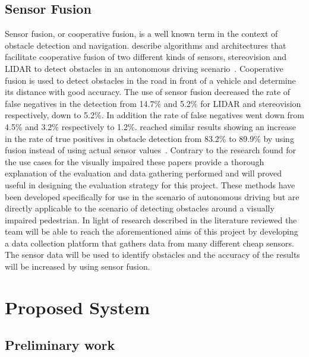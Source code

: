 \documentclass[prodmode,acmtosem]{acmsmall} %
\begin{document}
\subsection{Sensor Fusion}
Sensor fusion, or cooperative fusion, is a well known term in the context of obstacle detection and navigation. \citet{Labayrade2005} describe algorithms and architectures that facilitate cooperative fusion of two different kinds of sensors, stereovision and LIDAR to detect obstacles in an autonomous driving scenario~\cite{Labayrade2005}. Cooperative fusion is used to detect obstacles in the road in front of a vehicle and determine its distance with good accuracy. The use of sensor fusion decreased the rate of false negatives in the detection from 14.7\% and 5.2\% for LIDAR and stereovision respectively, down to 5.2\%. In addition the rate of false negatives went down from 4.5\% and 3.2\% respectively to 1.2\%. \citet{Cho2014} reached similar results showing an increase in the rate of true positives in obstacle detection from 83.2\% to 89.9\% by using fusion instead of using actual sensor values~\cite{Cho2014}. Contrary to the research found for the use cases for the visually impaired these papers provide a thorough explanation of the evaluation and data gathering performed and will proved useful in designing the evaluation strategy for this project. These methods have been developed specifically for use in the scenario of autonomous driving but are directly applicable to the scenario of detecting obstacles around a visually impaired pedestrian.
In light of research described in the literature reviewed the team will be able to reach the aforementioned aims of this project by developing a data collection platform that gathers data from many different cheap sensors. The sensor data will be used to identify obstacles and the accuracy of the results will be increased by using sensor fusion.


\section{Proposed System}
\subsection{Preliminary work}

\end{document}
